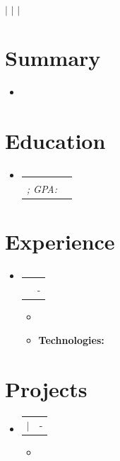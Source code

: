 \documentclass[letterpaper,11pt]{article}
\makeatletter
\newcommand{\resumeItem}[1]{
  \item\small{
    {#1 \vspace{-2pt}}
  }
}
\newcommand{\resumeSubheading}[4]{
  \vspace{-2pt}\item
    \begin{tabular*}{0.97\textwidth}[t]{l@{\extracolsep{\fill}}r}
      \textbf{#1} & #2 \\
      \textit{\small#3} & \textit{\small #4} \\
    \end{tabular*}\vspace{-7pt}
}
\newcommand{\resumeSubHeadingListStart}{\begin{itemize}[leftmargin=0.15in, label={}]}
\newcommand{\resumeSubHeadingListEnd}{\end{itemize}}
\newcommand{\resumeItemListStart}{\begin{itemize}}
\newcommand{\resumeItemListEnd}{\end{itemize}\vspace{-5pt}}
\newcommand{\technologies}[1]{
\noindent\textbf{Technologies:} #1
}
\newcommand{\resumeProjectHeading}[2]{
    \item
    \begin{tabular*}{0.97\textwidth}{l@{\extracolsep{\fill}}r}
      \small#1 & #2 \\
    \end{tabular*}\vspace{-7pt}
}
\makeatother
\begin{document}
\begin{center}
    {\LARGE \textbf{}} \\[4pt]
    \normalsize
    \href{mailto:\VAR{basic_details.email}}{} $|$ 
    \href{tel:\VAR{basic_details.phone}}{} $|$ 
    \href{\VAR{basic_details.github}}{} $|$ 
    \href{\VAR{basic_details.linkedin}}{}

\end{center}

\section{Summary}
\resumeSubHeadingListStart
  \item\small
    {}
\resumeSubHeadingListEnd

\section{Education}
  \resumeSubHeadingListStart
    \resumeSubheading
      { {\VAR{school.institution}} }{ {\VAR{school.location}} }
      { {\VAR{school.degree}}; GPA: {\VAR{school.gpa}} }{ {\VAR{school.year | string}} }
  \resumeSubHeadingListEnd

\section{Experience}
  \resumeSubHeadingListStart
    \resumeSubheading
      { {\VAR{job.company}} }{ {\VAR{job.location}} }
      { {\VAR{job.role}} }{ {\VAR{job.start}} - {\VAR{job.end}} }
      \resumeItemListStart
            \resumeItem{ {} }
      \resumeItem{ \technologies{} }
      \resumeItemListEnd
\resumeSubHeadingListEnd


\section{Projects}
\resumeSubHeadingListStart
{}
  \resumeProjectHeading
    {\href{ {\VAR{proj.link}} }{ \textbf{\VAR{proj.name}} }
    \BLOCK{if proj.technologies} $|$ \emph{{\VAR{proj.technologies | join(', ')}}} \BLOCK{endif}
    }
    { {\VAR{proj.start}} - {\VAR{proj.end}} }
  \resumeItemListStart
    \resumeItem{ {} }
  \resumeItemListEnd
{}
\resumeSubHeadingListEnd
\end{document}
